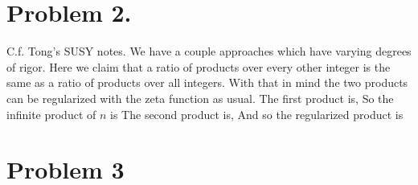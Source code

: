 \documentclass{article}
\begin{document}
\section*{Problem 2.}
C.f. Tong's SUSY notes. We have a couple approaches which have varying degrees of rigor.
Here we claim that a ratio of products over every other integer is the same as a ratio of products over all integers. With that in mind the two products can be regularized with the zeta function as usual. The first product is,
So the infinite product of $n$ is
The second product is,
And so the regularized product  is
\section*{Problem 3}
\end{document}
